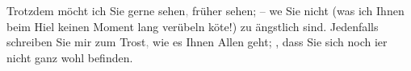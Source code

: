 \pstart
           Trotzdem möcht ich Sie gerne sehen\textcolor{gray}{,} früher sehen; – we{\geminationn} Sie nicht (was ich Ihnen beim Hi{\geminationm}el keinen Moment lang verübeln kö{\geminationn}te!) zu ängstlich sind. Jedenfalls schreiben Sie mir
               zum Trost\textcolor{gray}{,} wie es Ihnen Allen geht; \label{K_L03011-5v}\label{K_L03011-5},
               dass Sie sich noch i{\geminationm}er nicht ganz wohl befinden.\pend
           
